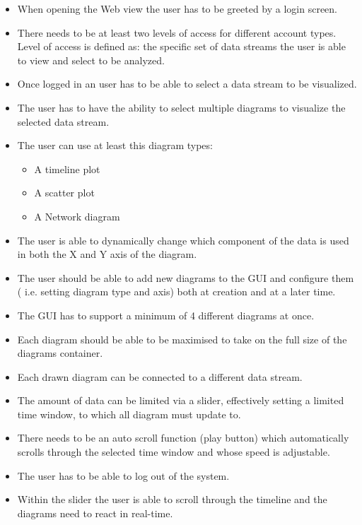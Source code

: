 \documentclass[twoside, english, draft]{Pflichtenheft}
\begin{document}
\begin{itemize}
\item{When opening the Web view the user has to be greeted by a login screen.}

\item{There needs to be at least two levels of access for different account types.
Level of access is defined as: the specific set of data streams the user is able to view and select to be analyzed.}
\item{Once logged in an user has to be able to select a data stream to be visualized.}
\item{The user has to have the ability to select multiple diagrams to visualize the selected data stream.}
\item{The user can use at least this diagram types:}
\begin{itemize}
\item{A timeline plot}
\item{A scatter plot}
\item{A Network diagram}
\end{itemize}
\item{The user is able to dynamically change which component of the data is used in both the X and Y axis of the diagram.}
\item{The user should be able to add new diagrams to the GUI and configure them ( i.e. setting diagram type and axis) both at creation and at a later time.
}
\item{The GUI has to support a minimum of 4 different diagrams at once.}
\item{Each diagram should be able to be maximised to take on the full size of the diagrams container.}
\item{Each drawn diagram can be connected to a different data stream.}
\item{The amount of data can be limited via a slider, effectively setting a limited time window, to which all diagram must update to.}
\item{There needs to be an auto scroll function (play button) which automatically scrolls through the selected time window and whose speed is adjustable.}
\item{The user has to be able to log out of the system.}
\item{Within the slider the user is able to scroll through the timeline and the diagrams need to react in real-time.}

\end{itemize}
\end{document}
